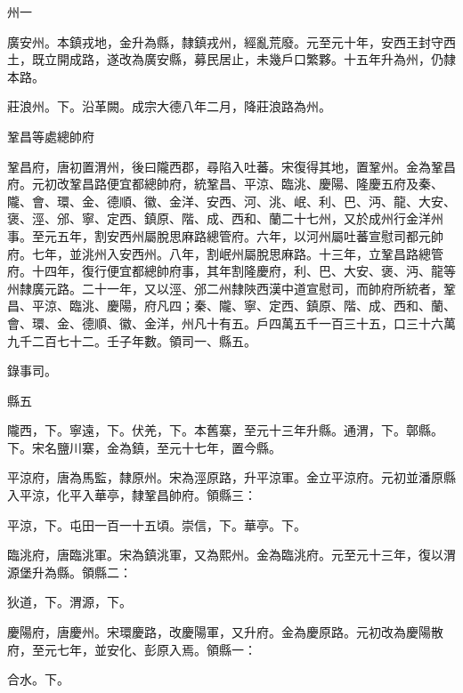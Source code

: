 \begin{pinyinscope}
 州一



 廣安州。本鎮戎地，金升為縣，隸鎮戎州，經亂荒廢。元至元十年，安西王封守西土，既立開成路，遂改為廣安縣，募民居止，未幾戶口繁夥。十五年升為州，仍隸本路。



 莊浪州。下。沿革闕。成宗大德八年二月，降莊浪路為州。



 鞏昌等處總帥府



 鞏昌府，唐初置渭州，後曰隴西郡，尋陷入吐蕃。宋復得其地，置鞏州。金為鞏昌府。元初改鞏昌路便宜都總帥府，統鞏昌、平涼、臨洮、慶陽、隆慶五府及秦、隴、會、環、金、德順、徽、金洋、安西、河、洮、岷、利、巴、沔、龍、大安、褒、涇、邠、寧、定西、鎮原、階、成、西和、蘭二十七州，又於成州行金洋州事。至元五年，割安西州屬脫思麻路總管府。六年，以河州屬吐蕃宣慰司都元帥府。七年，並洮州入安西州。八年，割岷州屬脫思麻路。十三年，立鞏昌路總管府。十四年，復行便宜都總帥府事，其年割隆慶府，利、巴、大安、褒、沔、龍等州隸廣元路。二十一年，又以涇、邠二州隸陜西漢中道宣慰司，而帥府所統者，鞏昌、平涼、臨洮、慶陽，府凡四；秦、隴、寧、定西、鎮原、階、成、西和、蘭、會、環、金、德順、徽、金洋，州凡十有五。戶四萬五千一百三十五，口三十六萬九千二百七十二。壬子年數。領司一、縣五。



 錄事司。



 縣五



 隴西，下。寧遠，下。伏羌，下。本舊寨，至元十三年升縣。通渭，下。鄣縣。下。宋名鹽川寨，金為鎮，至元十七年，置今縣。



 平涼府，唐為馬監，隸原州。宋為涇原路，升平涼軍。金立平涼府。元初並潘原縣入平涼，化平入華亭，隸鞏昌帥府。領縣三：



 平涼，下。屯田一百一十五頃。崇信，下。華亭。下。



 臨洮府，唐臨洮軍。宋為鎮洮軍，又為熙州。金為臨洮府。元至元十三年，復以渭源堡升為縣。領縣二：



 狄道，下。渭源，下。



 慶陽府，唐慶州。宋環慶路，改慶陽軍，又升府。金為慶原路。元初改為慶陽散府，至元七年，並安化、彭原入焉。領縣一：



 合水。下。




\end{pinyinscope}
